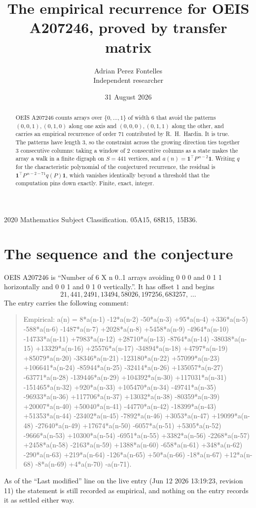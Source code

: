 \documentclass[11pt,a4paper]{article}
\title{The empirical recurrence for OEIS A207246, proved by transfer matrix}
\author{Adrian Perez Fontelles\\ \small Independent researcher}
\date{31 August 2026}
\theoremstyle{plain}
\theoremstyle{definition}
\begin{document}
\maketitle

\begin{abstract}
OEIS A207246 counts arrays over $\{0,\dots,1\}$ of width $6$ that avoid the patterns
$(0,0,1), (0,1,0)$ along one axis and $(0,0,0), (0,1,1)$ along the other, and carries an empirical recurrence of
order $71$ contributed by R.~H.~Hardin. It is true. The patterns have length $3$, so
the constraint across the growing direction ties together $3$ consecutive columns: taking a
window of $2$ consecutive columns as a state makes the array a walk in a finite digraph
on $S=441$ vertices, and $a(n)=\mathbf{1}^{\!\top}P^{\,n-2}\mathbf{1}$. Writing $q$
for the characteristic polynomial of the conjectured recurrence, the residual is
$\mathbf{1}^{\!\top}P^{\,n-2-71}q(P)\mathbf{1}$, which vanishes identically
beyond a threshold that the computation pins down exactly. Finite, exact, integer.
\end{abstract}

\noindent\small 2020 Mathematics Subject Classification. 05A15, 68R15, 15B36.\normalsize

\section{The sequence and the conjecture}

OEIS A207246 is ``Number of 6 X n 0..1 arrays avoiding 0 0 0 and 0 1 1 horizontally and 0 0 1 and 0 1 0 vertically.''. It has offset
$1$ and begins
\[
21, 441, 2491, 13494, 58026, 197256, 683257,\ \dots
\]
The entry carries the following comment:
\begin{quote}\small
Empirical: a(n) = 8*a(n-1) -12*a(n-2) -50*a(n-3) +95*a(n-4) +336*a(n-5) -588*a(n-6) -1487*a(n-7) +2028*a(n-8) +5458*a(n-9) -4964*a(n-10) -14733*a(n-11) +7983*a(n-12) +28710*a(n-13) -8764*a(n-14) -38038*a(n-15) +13329*a(n-16) +25576*a(n-17) -34894*a(n-18) +4797*a(n-19) +85079*a(n-20) -38346*a(n-21) -123180*a(n-22) +57099*a(n-23) +106641*a(n-24) -85944*a(n-25) -32414*a(n-26) +135057*a(n-27) -63771*a(n-28) -139446*a(n-29) +104392*a(n-30) +117031*a(n-31) -151465*a(n-32) +920*a(n-33) +105470*a(n-34) -49741*a(n-35) -96933*a(n-36) +117706*a(n-37) +13032*a(n-38) -80359*a(n-39) +20007*a(n-40) +50040*a(n-41) -44770*a(n-42) -18399*a(n-43) +51353*a(n-44) -23402*a(n-45) -7892*a(n-46) +3053*a(n-47) +19099*a(n-48) -27640*a(n-49) +17674*a(n-50) -6057*a(n-51) +5305*a(n-52) -9666*a(n-53) +10300*a(n-54) -6951*a(n-55) +3382*a(n-56) -2268*a(n-57) +2458*a(n-58) -2163*a(n-59) +1388*a(n-60) -658*a(n-61) +348*a(n-62) -290*a(n-63) +219*a(n-64) -126*a(n-65) +50*a(n-66) -18*a(n-67) +12*a(n-68) -8*a(n-69) +4*a(n-70) -a(n-71).
\end{quote}
As of the ``Last modified'' line on the live entry (Jun 12 2026 13:19:23, revision
11) the statement is still recorded as empirical, and nothing on the entry
records it as settled either way.
\end{document}
